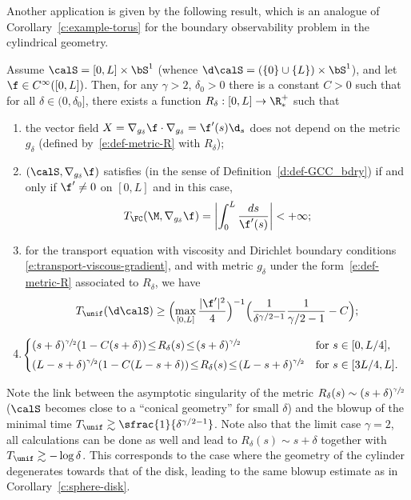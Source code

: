 \pagebreak[2]
Another application is given by the following result, which is an analogue of Corollary~\ref{c:example-torus} for the boundary observability problem in the cylindrical geometry.
\begin{corollary}
\label{c:example-cylinder}
Assume $\calS=[0,L]\times\bS^1$ (whence $\d\calS = (\{0\}\cup\{L\})\times\bS^1$), and let $\f\in C^{\infty}([0,L])$. Then, for any $\gamma >2$, $\delta_0>0$ there is a constant $C>0$ such that for all $\delta \in (0,\delta_0]$, there exists a function $R_\delta: [0,L]\to\R^+_*$ such that
\begin{enumerate}
\item the vector field $X= \nabla_{g_\delta}\f \cdot \nabla_{g_\delta} = \f'(s) \d_s$ does not depend on the metric $g_\delta$ (defined by~\eqref{e:def-metric-R} with $R_\delta$);
\item $(\calS,\nabla_{g_\delta}\f)$ satisfies \pFC (in the sense of Definition~\ref{d:def-GCC_bdry}) if and only if $\f' \neq 0$ on $[0,L]$ and in this case,
\[
T_{\FC}(\M,\nabla_{g_\delta}\f) = \biggl| \int_0^L \frac{ds}{\f'(s)} \biggr| <+\infty ;
\]
\item for the transport equation with viscosity and Dirichlet boundary conditions \eqref{e:transport-viscous-gradient}, and with metric $g_\delta$ under the form~\eqref{e:def-metric-R} associated to $R_\delta$, we have
\[
T_{\unif}(\d\calS) \geq \Bigl(\max_{[0,L]}\frac{|\f'|^2}{4} \Bigr)^{-1} \Bigl( \frac{1}{\delta^{\gamma/2-1}}\frac{1}{\gamma/2-1} - C \Bigr);
\]
\item \label{itemdelta}
$\hspace*{-1mm}\begin{cases}
(s+\delta)^{\sfrac{\gamma}{2}} (1-C (s+\delta)) \!\leq\! R_\delta(s) \!\leq\! (s+\delta)^{\sfrac{\gamma}{2}}& \text{for }s\in [0,L/4],\\[3pt]
(L-s+\delta)^{\sfrac{\gamma}{2}} (1-C (L-s+\delta)) \!\leq\! R_\delta(s) \!\leq\! (L-s+\delta)^{\sfrac{\gamma}{2}}&\text{for }s\in [3L/4,L].
\end{cases}$
\end{enumerate}
\end{corollary}
Note the link between the asymptotic singularity of the metric $R_\delta(s) \sim (s+\delta)^{\sfrac{\gamma}{2}}$ (\ie $\calS$ becomes close to a ``conical geometry'' for small $\delta$) and the blowup of the minimal time $T_{\unif} \gtrsim\sfrac{1}{\delta^{\gamma/2-1}}$. Note also that the limit case $\gamma =2$, all calculations can be done as well and lead to $R_\delta(s) \sim s+\delta$ together with $T_{\unif}\gtrsim -\log \delta$. This corresponds to the case where the geometry of the cylinder degenerates towards that of the disk, leading to the same blowup estimate as in Corollary~\ref{c:sphere-disk}.

